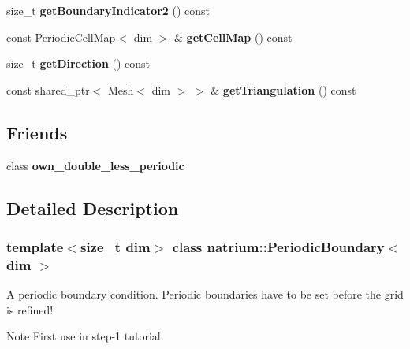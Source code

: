 \begin{DoxyCompactItemize}
\item 
\hypertarget{classnatrium_1_1PeriodicBoundary_af7e6f5b6028b0499df8335377156bc26}{
size\_\-t {\bfseries getBoundaryIndicator2} () const }
\label{classnatrium_1_1PeriodicBoundary_af7e6f5b6028b0499df8335377156bc26}

\item 
\hypertarget{classnatrium_1_1PeriodicBoundary_a4200caafcbda9553552220303e26bad0}{
const PeriodicCellMap$<$ dim $>$ \& {\bfseries getCellMap} () const }
\label{classnatrium_1_1PeriodicBoundary_a4200caafcbda9553552220303e26bad0}

\item 
\hypertarget{classnatrium_1_1PeriodicBoundary_a49e51f3612f67060f6189c3f92f64025}{
size\_\-t {\bfseries getDirection} () const }
\label{classnatrium_1_1PeriodicBoundary_a49e51f3612f67060f6189c3f92f64025}

\item 
\hypertarget{classnatrium_1_1PeriodicBoundary_abb9921fc031d1d8569742ba6459bafc0}{
const shared\_\-ptr$<$ Mesh$<$ dim $>$ $>$ \& {\bfseries getTriangulation} () const }
\label{classnatrium_1_1PeriodicBoundary_abb9921fc031d1d8569742ba6459bafc0}

\end{DoxyCompactItemize}
\subsection*{Friends}
\begin{DoxyCompactItemize}
\item 
\hypertarget{classnatrium_1_1PeriodicBoundary_a92462e8f67aa8d5e91e018a1cce70842}{
class {\bfseries own\_\-double\_\-less\_\-periodic}}
\label{classnatrium_1_1PeriodicBoundary_a92462e8f67aa8d5e91e018a1cce70842}

\end{DoxyCompactItemize}


\subsection{Detailed Description}
\subsubsection*{template$<$size\_\-t dim$>$ class natrium::PeriodicBoundary$<$ dim $>$}

A periodic boundary condition. Periodic boundaries have to be set before the grid is refined! \begin{DoxyNote}{Note}
First use in step-\/1 tutorial. 
\end{DoxyNote}


